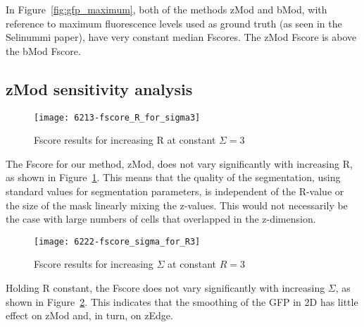 In Figure~\ref{fig:gfp_maximum}, both of the methods zMod and bMod, with reference to maximum fluorescence levels used as ground truth (as seen in the Selinummi paper), have very constant median Fscores. The zMod Fscore is above the bMod Fscore.

\subsection{zMod sensitivity analysis}

\begin{figure}[htbp!]
\centering
\texttt{[image: 6213-fscore\_R\_for\_sigma3]}
\caption{Fscore results for increasing R at constant $\Sigma=3$}
\label{fig:fscore_sigma3}
\end{figure}

The Fscore for our method, zMod, does not vary significantly with increasing R, as shown in Figure~\ref{fig:fscore_sigma3}. This means that the quality of the segmentation, using standard values for segmentation parameters, is independent of the R-value or the size of the mask linearly mixing the z-values. This would not necessarily be the case with large numbers of cells that overlapped in the z-dimension.

\begin{figure}[htbp!]
\centering
\texttt{[image: 6222-fscore\_sigma\_for\_R3]}
\caption{Fscore results for increasing $\Sigma$ at constant $R=3$}
\label{fig:fscore_r3}
\end{figure}

Holding R constant, the Fscore does not vary significantly with increasing $\Sigma$, as shown in Figure~\ref{fig:fscore_r3}. This indicates that the smoothing of the GFP in 2D has little effect on zMod and, in turn, on zEdge.
